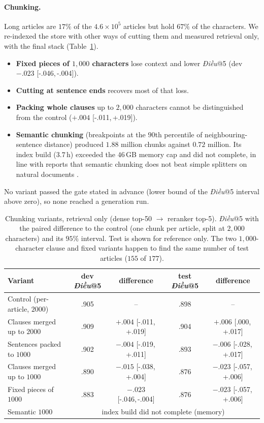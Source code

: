 \documentclass[11pt,a4paper]{article}
\newcommand{\dieu}{\textit{Điều}}
\newcommand{\ci}[2]{{\scriptsize[#1,\,#2]}}
\begin{document}
\paragraph{Chunking.}
Long articles are $17\%$ of the $4.6{\times}10^5$ articles but hold $67\%$ of the characters. We re-indexed the store with other ways of cutting them and measured retrieval only, with the final stack (Table~\ref{tab:chunk}).
\begin{itemize}[leftmargin=*]
\item \textbf{Fixed pieces of $1{,}000$ characters} lose context and lower \dieu{}@5 (dev $-.023$ \ci{-.046}{-.004}).
\item \textbf{Cutting at sentence ends} recovers most of that loss.
\item \textbf{Packing whole clauses} up to $2{,}000$ characters cannot be distinguished from the control ($+.004$ \ci{-.011}{+.019}).
\item \textbf{Semantic chunking} (breakpoints at the $90$th percentile of neighbouring-sentence distance) produced $1.88$ million chunks against $0.72$ million. Its index build ($3.7$\,h) exceeded the $46$\,GB memory cap and did not complete, in line with reports that semantic chunking does not beat simple splitters on natural documents \cite{vectara}.
\end{itemize}
No variant passed the gate stated in advance (lower bound of the \dieu{}@5 interval above zero), so none reached a generation run.
\begin{table}[H]
\centering
\caption{Chunking variants, retrieval only (dense top-50 $\to$ reranker top-5). \dieu{}@5 with the paired difference to the control (one chunk per article, split at $2{,}000$ characters) and its $95\%$ interval. Test is shown for reference only. The two $1{,}000$-character clause and fixed variants happen to find the same number of test articles ($155$ of $177$).}\label{tab:chunk}
\small\setlength{\tabcolsep}{4pt}
\begin{tabular}{@{}lcccc@{}}
\toprule
Variant & dev \dieu{}@5 & difference & test \dieu{}@5 & difference\\
\midrule
Control (per-article, $2000$) & .905 & -- & .898 & --\\
Clauses merged up to $2000$ & .909 & $+.004$ \ci{-.011}{+.019} & .904 & $+.006$ \ci{.000}{+.017}\\
Sentences packed to $1000$ & .902 & $-.004$ \ci{-.019}{+.011} & .893 & $-.006$ \ci{-.028}{+.017}\\
Clauses merged up to $1000$ & .890 & $-.015$ \ci{-.038}{+.004} & .876 & $-.023$ \ci{-.057}{+.006}\\
Fixed pieces of $1000$ & .883 & $-.023$ \ci{-.046}{-.004} & .876 & $-.023$ \ci{-.057}{+.006}\\
Semantic $1000$ & \multicolumn{4}{c}{index build did not complete (memory)}\\
\bottomrule
\end{tabular}
\end{table}
\end{document}
